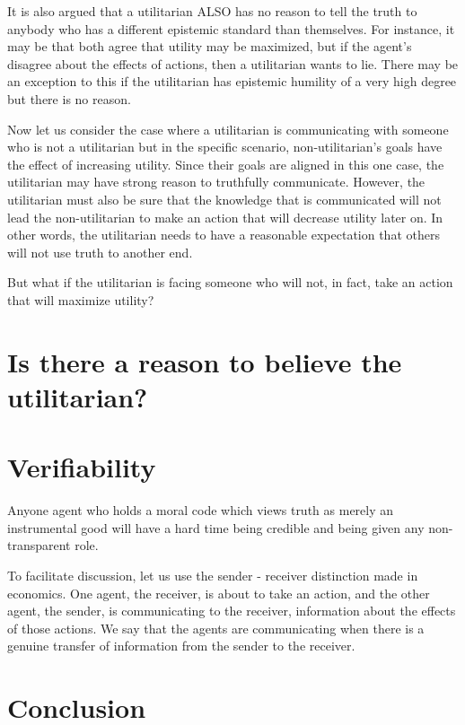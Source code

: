 \documentclass[11pt]{article}
\numberwithin{equation}{section}
\begin{document}
It is also argued that a utilitarian ALSO has no reason to tell the truth to anybody who has a different epistemic standard than themselves. For instance, it may be that both agree that utility may be maximized, but if the agent's disagree about the effects of actions, then a utilitarian wants to lie. There may be an exception to this if the utilitarian has epistemic humility of a very high degree but there is no reason.





Now let us consider the case where a utilitarian is communicating with someone who is not a utilitarian but in the specific scenario, non-utilitarian's goals have the effect of increasing utility. Since their goals are aligned in this one case, the utilitarian may have strong reason to truthfully communicate. However, the utilitarian must also be sure that the knowledge that is communicated will not lead the non-utilitarian to make an action that will decrease utility later on. In other words, the utilitarian needs to have a reasonable expectation that others will not use truth to another end. 

But what if the utilitarian is facing someone who will not, in fact, take an action that will maximize utility? 




\section{Is there a reason to believe the utilitarian?}




\section{Verifiability}


Anyone agent who holds a moral code which views truth as merely an instrumental good will have a hard time being credible and being given any non-transparent role. 

To facilitate discussion, let us use the sender - receiver distinction made in economics. One agent, the receiver, is about to take an action, and the other agent, the sender, is communicating to the receiver, information about the effects of those actions. We say that the agents are communicating when there is a genuine transfer of information from the sender to the receiver. 


\section{Conclusion}
\end{document}
